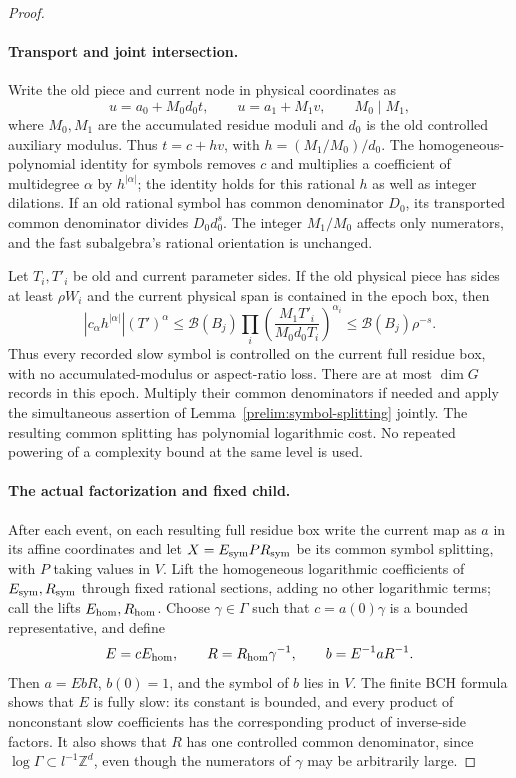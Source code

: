 \begin{proof}
\paragraph{Transport and joint intersection.}
Write the old piece and current node in physical coordinates as
\[
 u=a_0+M_0d_0t,\qquad u=a_1+M_1v,\qquad M_0\mid M_1,
\]
where $M_0,M_1$ are the accumulated residue moduli and
$d_0$ is the old controlled auxiliary modulus.  Thus
$t=c+hv$, with $h=(M_1/M_0)/d_0$.
The homogeneous-polynomial identity for symbols removes $c$ and
multiplies a coefficient of multidegree $\alpha$ by $h^{|\alpha|}$;
the identity holds for this rational $h$ as well as integer dilations.
If an old rational symbol has common denominator $D_0$, its
transported common denominator divides $D_0d_0^s$.
The integer $M_1/M_0$ affects only numerators, and the fast
subalgebra's rational orientation is unchanged.

Let $T_i,T'_i$ be old and current parameter sides.  If the old
physical piece has sides at least $\rho W_i$ and the current
physical span is contained in the epoch box, then
\[
 |c_\alpha h^{|\alpha|}|(T')^\alpha
 \le \mathcal B(B_j)
 \prod_i\left(\frac{M_1T'_i}{M_0d_0T_i}\right)^{\alpha_i}
 \le \mathcal B(B_j)\rho^{-s}.
\]
Thus every recorded slow symbol is controlled on the current full
residue box, with no accumulated-modulus or aspect-ratio loss.
There are at most $\dim G$ records in this epoch.  Multiply their
common denominators if needed and apply the simultaneous assertion
of Lemma~\ref{prelim:symbol-splitting} jointly.  The resulting common
splitting has polynomial logarithmic cost.  No repeated powering
of a complexity bound at the same level is used.

\paragraph{The actual factorization and fixed child.}
After each event, on each resulting full residue box write the
current map as $a$ in its affine coordinates and let
$X=E_{\rm sym}PR_{\rm sym}$ be its common symbol splitting, with
$P$ taking values in $V$.  Lift the homogeneous logarithmic
coefficients of $E_{\rm sym},R_{\rm sym}$ through fixed rational
sections, adding no other logarithmic terms; call the lifts
$E_{\rm hom},R_{\rm hom}$.  Choose $\gamma\in\Gamma$ such that
$c=a(0)\gamma$ is a bounded representative, and define
\[
 E=cE_{\rm hom},\qquad R=R_{\rm hom}\gamma^{-1},
 \qquad b=E^{-1}aR^{-1}.
\]
Then $a=EbR$, $b(0)=1$, and the symbol of $b$ lies in $V$.
The finite BCH formula shows that $E$ is fully slow: its constant
is bounded, and every product of nonconstant slow coefficients
has the corresponding product of inverse-side factors.
It also shows that $R$ has one controlled common denominator,
since $\log\Gamma\subset l^{-1}\mathbb Z^d$, even though the
numerators of $\gamma$ may be arbitrarily large.


\end{proof}

